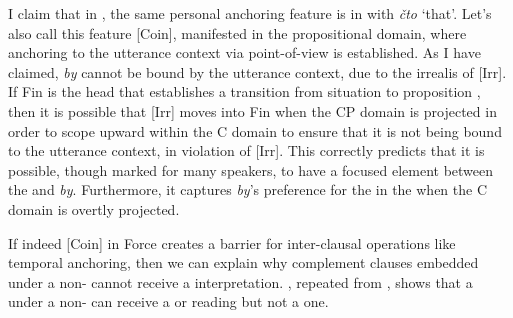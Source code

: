 \documentclass[output=paper,modfonts,newtxmath,hidelinks,]{langscibook}
\begin{document}
I claim that in , the same personal anchoring feature is in  with \textit{čto} `that'. Let’s also call this feature [Coin], manifested in the propositional domain, where anchoring to the utterance context via point-of-view is established. As I have claimed, \textit{by} cannot be bound by the utterance context, due to the irrealis  of [Irr]. If Fin is the head that establishes a transition from situation to proposition \citep{RamchandSvenonius2014}, then it is possible that [Irr] moves into Fin when the CP domain is projected in order to scope upward within the C domain to ensure that it is not being bound to the utterance context, in violation of [Irr]. This correctly predicts that it is possible, though marked for many speakers, to have a focused element between the  and \textit{by}. Furthermore, it captures \textit{by}’s preference for the  in the  when the C domain is overtly projected. 

If indeed [Coin] in Force creates a barrier for inter-clausal operations like temporal anchoring, then we can explain why  complement clauses embedded under a non-  cannot receive a  interpretation. , repeated from , shows that a    under a non-  can receive a  or  reading but not a  one.

\ea \label{10:ex33}
    \hfill \citep[8]{Asarina2006}
	\z
\z
\end{document}
